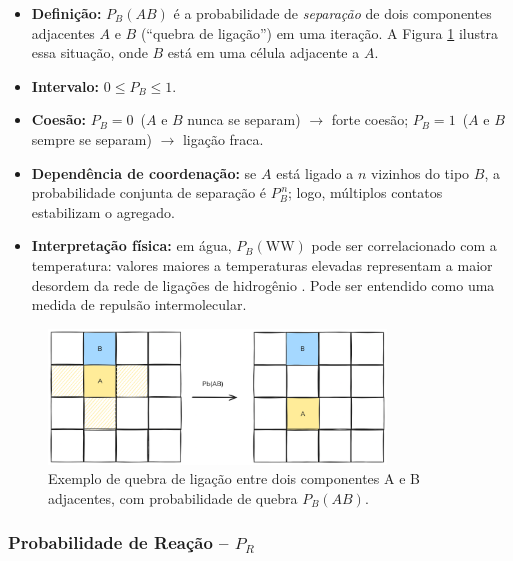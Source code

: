 \documentclass[12pt,oneside]{report}
\begin{document}
\begin{itemize}
    \item \textbf{Definição:} $P_B(AB)$ é a probabilidade de
          \emph{separação} de dois componentes adjacentes $A$ e $B$
          (``quebra de ligação'') em uma iteração. A Figura \ref{fig:quebra_ligacao} ilustra essa situação, onde $B$ está em uma célula adjacente a $A$.
    \item \textbf{Intervalo:} $0 \le P_B \le 1$.
    \item \textbf{Coesão:} $P_B=0$ \,($A$ e $B$ nunca se separam)
          $\rightarrow$ forte coesão;
          $P_B=1$ \,($A$ e $B$ sempre se separam) $\rightarrow$ ligação fraca.
    \item \textbf{Dependência de coordenação:} se $A$ está ligado a
          $n$ vizinhos do tipo $B$, a probabilidade conjunta de separação é
          $P_B^{\,n}$; logo, múltiplos contatos estabilizam o agregado.
    \item \textbf{Interpretação física:}
          em água, $P_B(\mathrm{WW})$ pode ser correlacionado com a temperatura:
          valores maiores a temperaturas elevadas representam a maior
          desordem da rede de ligações de hidrogênio \cite{kier2005}. Pode ser entendido como uma medida de repulsão intermolecular.
\end{itemize}

\begin{figure}[H]
    \centering
    \includegraphics[width=0.8\textwidth]{img/PbAB.png}
    \caption{\small Exemplo de quebra de ligação entre dois componentes A e B adjacentes, com probabilidade de quebra $P_B(AB)$.}
    \label{fig:quebra_ligacao}
\end{figure}

\subsubsection{Probabilidade de Reação – \texorpdfstring{$P_R$}{Pr}}
\label{subsubsec:Pr}
\end{document}
